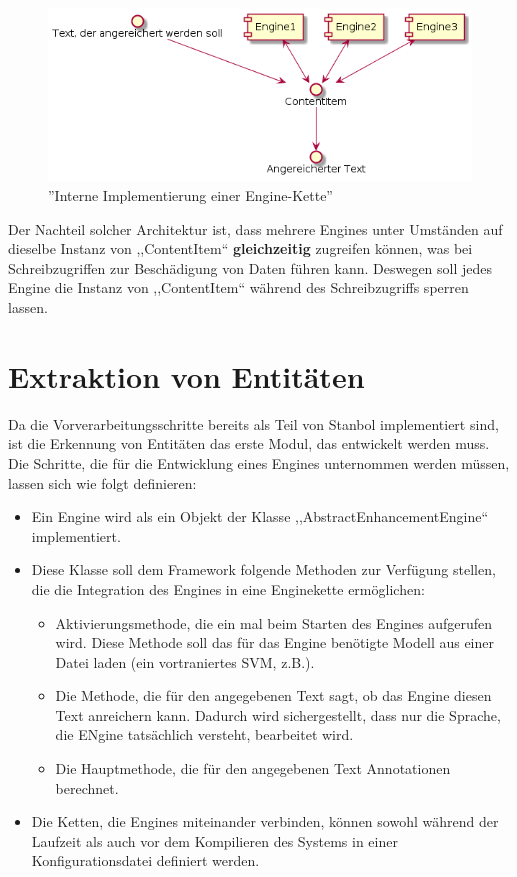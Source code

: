 \begin{figure}[ht]
\centering
\includegraphics[width=\textwidth]{Bilder/realarch.png}
\caption{''Interne Implementierung einer Engine-Kette''}
\label{fig:REALPIPELINE}
\end{figure}
Der Nachteil solcher Architektur ist, dass mehrere Engines unter Umständen auf dieselbe Instanz von ,,ContentItem`` \textbf{gleichzeitig} zugreifen können, was bei Schreibzugriffen zur Beschädigung von Daten führen kann. Deswegen soll jedes Engine die Instanz von ,,ContentItem`` während des Schreibzugriffs sperren lassen.

\section{Extraktion von Entitäten} \label{sec:extraktimpl}
Da die Vorverarbeitungsschritte bereits als Teil von Stanbol implementiert sind, ist die Erkennung von Entitäten das erste Modul, das entwickelt werden muss. Die Schritte, die für die Entwicklung eines Engines unternommen werden müssen, lassen sich wie folgt definieren:
\begin{itemize}
\item Ein Engine wird als ein Objekt der Klasse ,,AbstractEnhancementEngine`` implementiert. 
\item Diese Klasse soll dem Framework folgende Methoden zur Verfügung stellen, die die Integration des Engines in eine Enginekette ermöglichen:
\begin{itemize}
\item Aktivierungsmethode, die ein mal beim Starten des Engines aufgerufen wird. Diese Methode soll das für das Engine benötigte Modell aus einer Datei laden (ein vortraniertes SVM, z.B.).
\item Die Methode, die für den angegebenen Text sagt, ob das Engine diesen Text anreichern kann. Dadurch wird sichergestellt, dass nur die Sprache, die ENgine tatsächlich versteht, bearbeitet wird.
\item Die Hauptmethode, die für den angegebenen Text Annotationen berechnet.
\end{itemize}
\item Die Ketten, die Engines miteinander verbinden, können sowohl während der Laufzeit als auch vor dem Kompilieren des Systems in einer Konfigurationsdatei definiert werden.
\end{itemize}

